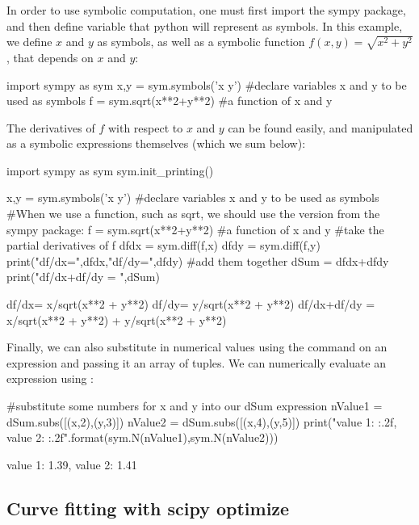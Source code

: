 In order to use symbolic computation, one must first import the sympy package, and then define variable that python will represent as symbols. In this example, we define $x$ and $y$ as symbols, as well as a symbolic function $f(x,y)=\sqrt{x^2+y^2}$, that depends on $x$ and $y$:

\begin{python}[caption = Sympy for symbolic computations in python]
import sympy as sym
x,y = sym.symbols('x y')  #declare variables x and y to be used as symbols
f = sym.sqrt(x**2+y**2) #a function of x and y
\end{python}

The derivatives of $f$ with respect to $x$ and $y$ can be found easily, and manipulated as a symbolic expressions themselves (which we sum below):
\begin{python}[caption = Using sympy to compute a symbolic derivative]
import sympy as sym
sym.init_printing()

x,y = sym.symbols('x y')  #declare variables x and y to be used as symbols
#When we use a function, such as sqrt, we should use the version from the sympy package:
f = sym.sqrt(x**2+y**2) #a function of x and y
#take the partial derivatives of f
dfdx = sym.diff(f,x)
dfdy = sym.diff(f,y)
print("df/dx=",dfdx,"df/dy=",dfdy)
#add them together
dSum = dfdx+dfdy
print("df/dx+df/dy = ",dSum)
\end{python}
\begin{poutput}
df/dx= x/sqrt(x**2 + y**2) df/dy= y/sqrt(x**2 + y**2)
df/dx+df/dy =  x/sqrt(x**2 + y**2) + y/sqrt(x**2 + y**2)
\end{poutput}

Finally, we can also substitute in numerical values using the  command on an expression and passing it an array of tuples. We can numerically evaluate an expression using :
\begin{python}[caption = Substituting numerical values into expressions from sympy]
#substitute some numbers for x and y into our dSum expression
nValue1 = dSum.subs([(x,2),(y,3)])
nValue2 = dSum.subs([(x,4),(y,5)])
print("value 1: {:.2f}, value 2: {:.2f}".format(sym.N(nValue1),sym.N(nValue2)))
\end{python}
\begin{poutput}
value 1: 1.39, value 2: 1.41
\end{poutput}

\subsection{Curve fitting with scipy optimize}

